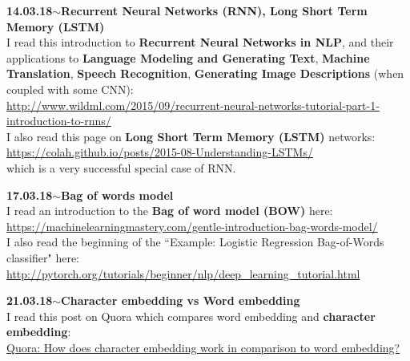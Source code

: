 \documentclass[11pt,a4paper]{article}
\newenvironment{loggentry}[2]%
{\noindent\textbf{#1}\hspace{1cm}$\mathbf{\sim}$\text{ }\textbf{#2}\\}{\vspace{0.5cm}}
\begin{document}
\begin{loggentry}{14.03.18}{Recurrent Neural Networks (RNN), Long Short Term Memory (LSTM)}
I read this introduction to \textbf{Recurrent Neural Networks in NLP}, and their applications to \textbf{Language Modeling and Generating Text}, \textbf{Machine Translation}, \textbf{Speech Recognition}, \textbf{Generating Image Descriptions} (when coupled with some CNN):\\
\url{http://www.wildml.com/2015/09/recurrent-neural-networks-tutorial-part-1-introduction-to-rnns/}\\
I also read this page on \textbf{Long Short Term Memory (LSTM)} networks:\\
\url{https://colah.github.io/posts/2015-08-Understanding-LSTMs/}\\
which is a very successful special case of RNN.
\end{loggentry}

\begin{loggentry}{17.03.18}{Bag of words model}
I read an introduction to the \textbf{Bag of word model (BOW)} here:\\
\url{https://machinelearningmastery.com/gentle-introduction-bag-words-model/}\\
I also read the beginning of the ``Example: Logistic Regression Bag-of-Words classifier" here:\\
\url{http://pytorch.org/tutorials/beginner/nlp/deep_learning_tutorial.html}
\end{loggentry}

\begin{loggentry}{21.03.18}{Character embedding vs Word embedding}
I read this post on Quora which compares word embedding and \textbf{character embedding}:\\
\href{https://www.quora.com/How-does-character-embedding-work-in-comparison-to-word-embedding}{Quora: How does character embedding work in comparison to word embedding?}\\
\end{loggentry}
\end{document}
